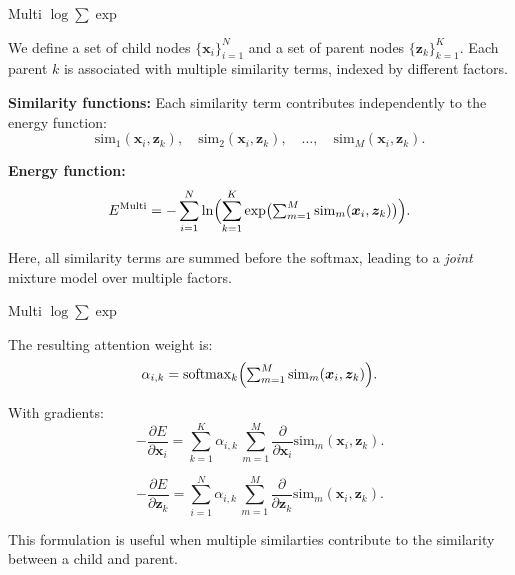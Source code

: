 \documentclass{beamer}
\begin{document}
\begin{frame}{Multi $\log \sum \exp$}

    We define a set of child nodes \(\{\bm{x}_i\}_{i=1}^N\) and a set of parent nodes \(\{\bm{z}_k\}_{k=1}^K\). Each parent \(k\) is associated with multiple similarity terms, indexed by different factors.
    
    \bigskip
    
    \textbf{Similarity functions:}  
    Each similarity term contributes independently to the energy function:
    \[
    \mathrm{sim}_1(\bm{x}_i, \bm{z}_k), \quad
    \mathrm{sim}_2(\bm{x}_i, \bm{z}_k), \quad \dots, \quad
    \mathrm{sim}_M(\bm{x}_i, \bm{z}_k).
    \]
    
    \bigskip
    
    \textbf{Energy function:}
    \[
    E^{\mathrm{Multi}}
    =
    -\sum_{i=1}^N
    \ln \Bigl(\sum_{k=1}^K
    \exp\bigl(\textstyle\sum_{m=1}^M \mathrm{sim}_m(\bm{x}_i, \bm{z}_k)\bigr)\Bigr).
    \]
    
    Here, all similarity terms are summed before the softmax, leading to a \emph{joint} mixture model over multiple factors.
    
    \end{frame}
    
    \begin{frame}{Multi $\log \sum \exp$}
    
    The resulting attention weight is:
    \[
    \alpha_{i,k} 
    =
    \mathrm{softmax}_{k} \Bigl(\textstyle\sum_{m=1}^M \mathrm{sim}_m(\bm{x}_i, \bm{z}_k)\Bigr).
    \]
    
    With gradients: 
     \[
    -\frac{\partial E}{\partial \bm{x}_i}
    =
    \sum_{k=1}^K 
    \alpha_{i,k}\,
    \sum_{m=1}^M
    \frac{\partial}{\partial \bm{x}_i}
    \mathrm{sim}_m(\bm{x}_i, \bm{z}_k).
    \]
    
    \bigskip
        \[
    -\frac{\partial E}{\partial \bm{z}_k}
    =
    \sum_{i=1}^N 
    \alpha_{i,k}\,
    \sum_{m=1}^M
    \frac{\partial}{\partial \bm{z}_k}
    \mathrm{sim}_m(\bm{x}_i, \bm{z}_k).
    \]

    This formulation is useful when multiple similarties contribute to the similarity between a child and parent.
    
    \end{frame}
    
\end{document}
